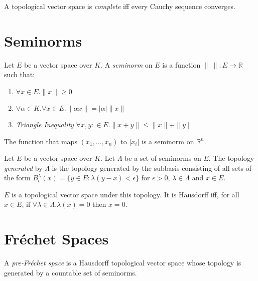\begin{df}
A topological vector space is \emph{complete} iff every Cauchy sequence converges.
\end{df}

\section{Seminorms}

\begin{df}[Seminorm]
Let $E$ be a vector space over $K$. A \emph{seminorm} on $E$ is a function $\|\ \| : E \rightarrow \mathbb{R}$ such that:
\begin{enumerate}
\item $\forall x \in E. \| x \| \geq 0$
\item $\forall \alpha \in K. \forall x \in E. \| \alpha x \| = |\alpha| \|x\|$
\item \emph{Triangle Inequality} $\forall x,y : \in E. \| x + y \| \leq \| x \| + \| y \|$
\end{enumerate}
\end{df}

\begin{ex}
The function that maps $(x_1, \ldots, x_n)$ to $|x_i|$ is a seminorm on $\mathbb{R}^n$.
\end{ex}

\begin{df}
Let $E$ be a vector space over $K$.
Let $\Lambda$ be a set of seminorms on $E$. The topology \emph{generated} by $\Lambda$ is the topology generated by the subbasis consisting of all sets of the form $B_\epsilon^\lambda(x) = \{ y \in E : \lambda(y-x) < \epsilon \}$ for $\epsilon > 0$, $\lambda \in \Lambda$ and $x \in E$.
\end{df}

\begin{prop}
$E$ is a topological vector space under this topology. It is Hausdorff iff, for all $x \in E$, if $\forall \lambda \in \Lambda. \lambda(x) = 0$ then $x = 0$.
\end{prop}

\section{Fr\'{e}chet Spaces}

\begin{df}
A \emph{pre-Fr\'{e}chet space} is a Hausdorff topological vector space whose topology is generated by a countable set of seminorms.
\end{df}

